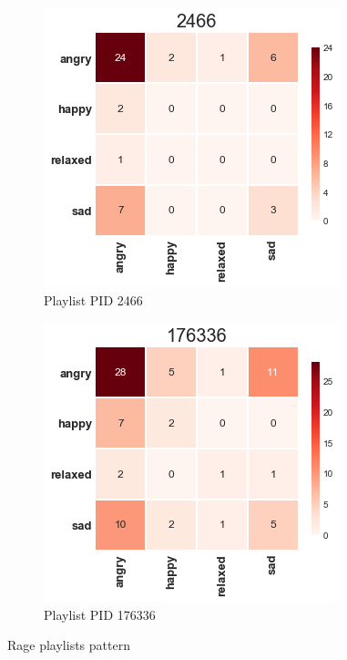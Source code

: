 \begin{figure}[H]
  \centering
  \begin{subfigure}[b]{0.49\linewidth}
    \includegraphics[width=\linewidth]{./chapters/chapter5/images/2466.png}
    \caption{Playlist PID 2466}
  \end{subfigure}
  \begin{subfigure}[b]{0.49\linewidth}
   \includegraphics[width=\linewidth]{./chapters/chapter5/images/176336.png}
    \caption{Playlist PID 176336}
  \end{subfigure}
  \caption{Rage playlists pattern}
  \label{fig:ann}
\end{figure}


